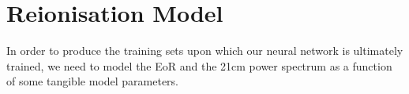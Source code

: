 \documentclass[useAMS,usenatbib]{mnras}
\newcommand{\pd}[2]{\frac{\partial #1}{\partial #2}}
\begin{document}


\section{Reionisation Model} 
\label{sec: model}

In order to produce the training sets upon which our neural network is ultimately trained, we need to model the EoR and the 21cm power spectrum as a function of some tangible model parameters. 
\end{document}
